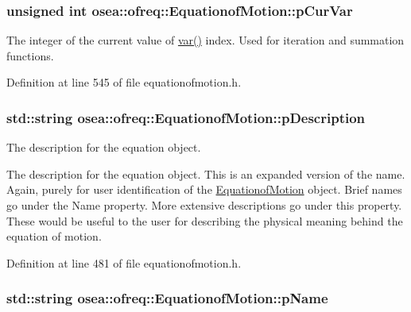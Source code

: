\hypertarget{classosea_1_1ofreq_1_1_equationof_motion_a88a53c5688c07a1cb90cdf5755782fcf}{
\subsubsection[{p\-Cur\-Var}]{\setlength{\rightskip}{0pt plus 5cm}unsigned int osea\-::ofreq\-::\-Equationof\-Motion\-::p\-Cur\-Var\hspace{0.3cm}{\ttfamily [protected]}}}\label{classosea_1_1ofreq_1_1_equationof_motion_a88a53c5688c07a1cb90cdf5755782fcf}


The integer of the current value of \hyperlink{classosea_1_1ofreq_1_1_equationof_motion_ab69511cc5037376cf7da80ce30d9eaab}{var()} index. Used for iteration and summation functions. 



Definition at line 545 of file equationofmotion.\-h.

\hypertarget{classosea_1_1ofreq_1_1_equationof_motion_aa6ce10dacd47441d445a9170bd355792}{
\subsubsection[{p\-Description}]{\setlength{\rightskip}{0pt plus 5cm}std\-::string osea\-::ofreq\-::\-Equationof\-Motion\-::p\-Description\hspace{0.3cm}{\ttfamily [protected]}}}\label{classosea_1_1ofreq_1_1_equationof_motion_aa6ce10dacd47441d445a9170bd355792}


The description for the equation object. 

The description for the equation object. This is an expanded version of the name. Again, purely for user identification of the \hyperlink{classosea_1_1ofreq_1_1_equationof_motion}{Equationof\-Motion} object. Brief names go under the Name property. More extensive descriptions go under this property. These would be useful to the user for describing the physical meaning behind the equation of motion. 

Definition at line 481 of file equationofmotion.\-h.

\hypertarget{classosea_1_1ofreq_1_1_equationof_motion_a5848a1ad14d31556fd1b62b4e3de3643}{
\subsubsection[{p\-Name}]{\setlength{\rightskip}{0pt plus 5cm}std\-::string osea\-::ofreq\-::\-Equationof\-Motion\-::p\-Name\hspace{0.3cm}{\ttfamily [protected]}}}\label{classosea_1_1ofreq_1_1_equationof_motion_a5848a1ad14d31556fd1b62b4e3de3643}


